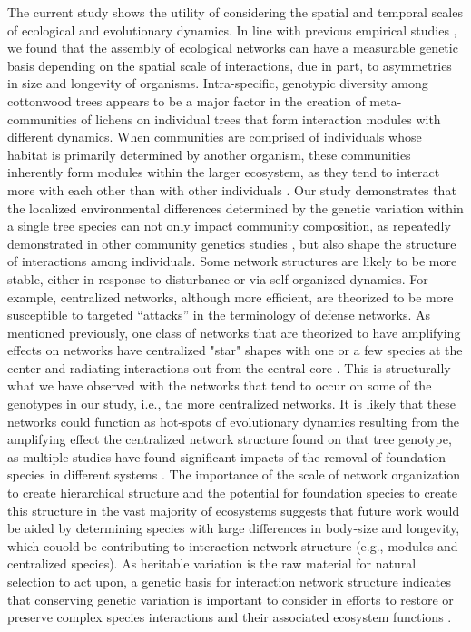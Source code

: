 \documentclass[fleqn,12pt]{olplainarticle}
\begin{document}
The current study shows the utility of considering the spatial and
temporal scales of ecological and evolutionary dynamics. In line with
previous empirical studies \citep{Bangert2006, Zook2010,
  Zytynska2012}, we found that the assembly of ecological networks can
have a measurable genetic basis depending on the spatial scale of
interactions, due in part, to asymmetries in size and longevity of
organisms.  Intra-specific, genotypic diversity among cottonwood trees
appears to be a major factor in the creation of meta-communities of
lichens on individual trees that form interaction modules with
different dynamics. When communities are comprised of individuals
whose habitat is primarily determined by another organism, these
communities inherently form modules within the larger ecosystem, as
they tend to interact more with each other than with other individuals
\citep{Lau2017a}. Our study demonstrates that the localized
environmental differences determined by the genetic variation within a
single tree species can not only impact community composition, as
repeatedly demonstrated in other community genetics studies
\citep{Whitham2006a, DesRoches2018TheVariation}, but also shape the
structure of interactions among individuals. Some network structures
are likely to be more stable, either in response to disturbance or via
self-organized dynamics. For example, centralized networks, although
more efficient, are theorized to be more susceptible to targeted
``attacks'' in the terminology of defense networks. As mentioned
previously, one class of networks that are theorized to have
amplifying effects on networks have centralized "star" shapes with one
or a few species at the center and radiating interactions out from the
central core \citep{Lieberman2005EvolutionaryGraphs}. This is
structurally what we have observed with the networks that tend to
occur on some of the genotypes in our study, i.e., the more
centralized networks. It is likely that these networks could function
as hot-spots of evolutionary dynamics resulting from the amplifying
effect the centralized network structure found on that tree genotype,
as multiple studies have found significant impacts of the removal of
foundation species in different systems \citep{Keith2017,
  DesRoches2018TheVariation}. The importance of the scale of network
organization to create hierarchical structure
\citep{Guimaraes2020TheOrganization} and the potential for foundation
species to create this structure in the vast majority of ecosystems
\citep{Ellison2005, Whitham2006a} suggests that future work would be
aided by determining species with large differences in body-size and
longevity, which couold be contributing to interaction network
structure (e.g., modules and centralized species). As heritable
variation is the raw material for natural selection to act upon, a
genetic basis for interaction network structure indicates that
conserving genetic variation is important to consider in efforts to
restore or preserve complex species interactions and their associated
ecosystem functions \citep{ Whitham2012, Evans2013,
  Whitham2020IntraspecificEvolution}.
\end{document}
